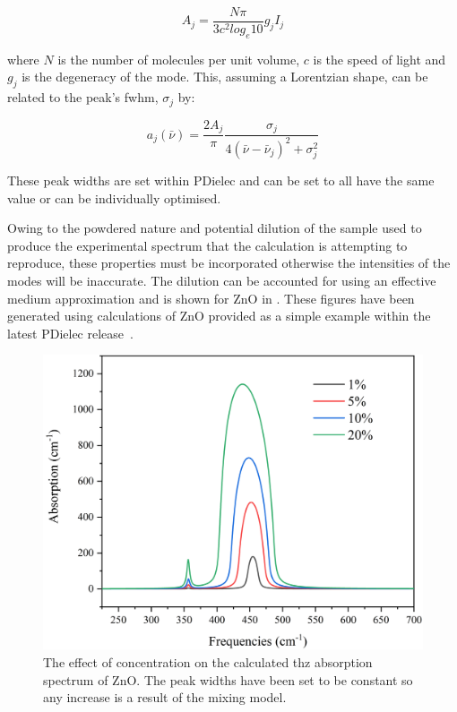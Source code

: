\begin{equation}
A_j = \frac{N \pi}{3 c^2 log_e 10} g_j I_j
\end{equation}

where \(N\) is the number of molecules per unit volume, \(c\) is the speed of light and \(g_j\) is the degeneracy of the mode. This, assuming a Lorentzian shape, can be related to the peak's \acrfull{fwhm}, \(\sigma_j\) by:

\begin{equation}
a_j(\bar{\nu}) = \frac{2 A_j}{\pi} \frac{\sigma_j}{4(\bar{\nu} - \bar{\nu}_j)^2 + \sigma_j^2}
\end{equation}

These peak widths are set within PDielec and can be set to all have the same value or can be individually optimised.

Owing to the powdered nature and potential dilution of the sample used to produce the experimental spectrum that the calculation is attempting to reproduce, these properties must be incorporated otherwise the intensities of the modes will be inaccurate. The dilution can be accounted for using an effective medium approximation and is shown for ZnO in . These figures have been generated using calculations of ZnO provided as a simple example within the latest PDielec release~\cite{john_kendrick_2022_5888313}.

\begin{figure}
    \centering
    \includegraphics[scale=0.6]{Figures/Misc/Theory/ConcentrationG.png}
    \captionsetup{font = footnotesize, justification = centering}
    \caption[The Effect of Concentration on the Calculated THz Absorption Spectrum of ZnO]{The effect of concentration on the calculated \acrshort{thz} absorption spectrum of ZnO. The peak widths have been set to be constant so any increase is a result of the mixing model.}
    \label{fig:ConcPDGUI}
\end{figure}

